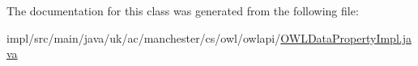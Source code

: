 The documentation for this class was generated from the following file\-:\begin{DoxyCompactItemize}
\item 
impl/src/main/java/uk/ac/manchester/cs/owl/owlapi/\hyperlink{_o_w_l_data_property_impl_8java}{O\-W\-L\-Data\-Property\-Impl.\-java}\end{DoxyCompactItemize}
